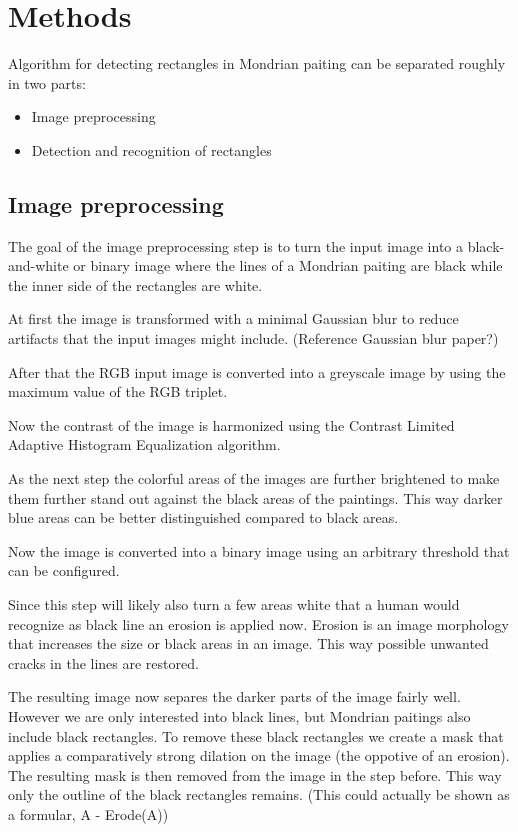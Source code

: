 \section{Methods}


Algorithm for detecting rectangles in Mondrian paiting can be separated roughly
in two parts:
\begin{itemize}
  \item Image preprocessing
  \item Detection and recognition of rectangles
\end{itemize}

\subsection{Image preprocessing}

The goal of the image preprocessing step is to turn the input image into a
black-and-white or binary image where the lines of a Mondrian paiting are black
while the inner side of the rectangles are white.

At first the image is transformed with a minimal Gaussian blur to reduce
artifacts that the input images might include. (Reference Gaussian blur paper?)

After that the RGB input image is converted into a greyscale image by using the
maximum value of the RGB triplet.

Now the contrast of the image is harmonized using the Contrast Limited Adaptive
Histogram Equalization algorithm.

As the next step the colorful areas of the images are further brightened to make
them further stand out against the black areas of the paintings. This way darker
blue areas can be better distinguished compared to black areas.

Now the image is converted into a binary image using an arbitrary threshold that
can be configured.

Since this step will likely also turn a few areas white that a human would
recognize as black line an erosion is applied now. Erosion is an image morphology
that increases the size or black areas in an image. This way possible unwanted
cracks in the lines are restored.

The resulting image now separes the darker parts of the image fairly well.
However we are only interested into black lines, but Mondrian paitings also include
black rectangles. To remove these black rectangles we create a mask that applies a
comparatively strong dilation on the image (the oppotive of an erosion). The resulting
mask is then removed from the image in the step before. This way only the outline of the
black rectangles remains. (This could actually be shown as a formular, A - Erode(A))


